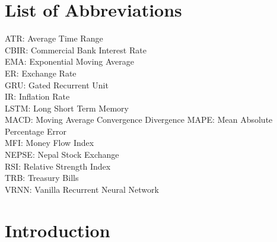 \chapter*{List of Abbreviations}
ATR:      Average Time Range\\
CBIR:   Commercial Bank Interest Rate\\
EMA:     Exponential Moving Average\\
ER:        Exchange Rate\\
GRU:    Gated Recurrent Unit\\
IR:         Inflation Rate \\
LSTM:  Long Short Term Memory\\
MACD:  Moving Average Convergence Divergence
MAPE:   Mean Absolute Percentage Error\\
MFI:       Money Flow Index\\
NEPSE:  Nepal Stock Exchange\\
RSI:        Relative Strength Index\\
TRB:      Treasury Bills\\
VRNN: Vanilla Recurrent Neural Network\\


\newpage
{} %

\chapter{Introduction}
\vspace{-18pt}
